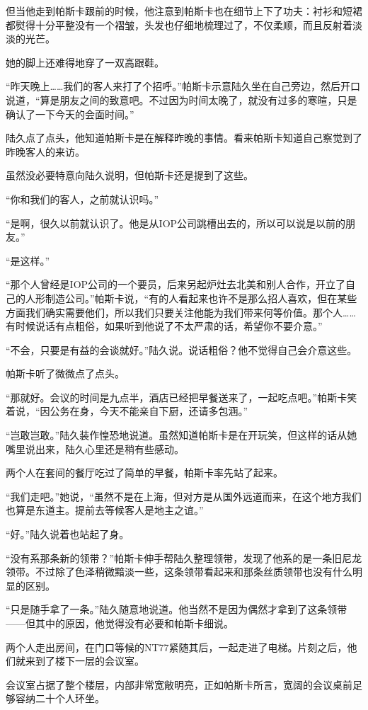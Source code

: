 但当他走到帕斯卡跟前的时候，他注意到帕斯卡也在细节上下了功夫：衬衫和短裙都熨得十分平整没有一个褶皱，头发也仔细地梳理过了，不仅柔顺，而且反射着淡淡的光芒。

她的脚上还难得地穿了一双高跟鞋。

“昨天晚上……我们的客人来打了个招呼。”帕斯卡示意陆久坐在自己旁边，然后开口说道，“算是朋友之间的致意吧。不过因为时间太晚了，就没有过多的寒暄，只是确认了一下今天的会面时间。”

陆久点了点头，他知道帕斯卡是在解释昨晚的事情。看来帕斯卡知道自己察觉到了昨晚客人的来访。

虽然没必要特意向陆久说明，但帕斯卡还是提到了这些。

“你和我们的客人，之前就认识吗。”

“是啊，很久以前就认识了。他是从IOP公司跳槽出去的，所以可以说是以前的朋友。”

“是这样。”

“那个人曾经是IOP公司的一个要员，后来另起炉灶去北美和别人合作，开立了自己的人形制造公司。”帕斯卡说，“有的人看起来也许不是那么招人喜欢，但在某些方面我们确实需要他们，所以我们只要关注他能为我们带来何等价值。那个人……有时候说话有点粗俗，如果听到他说了不太严肃的话，希望你不要介意。”

“不会，只要是有益的会谈就好。”陆久说。说话粗俗？他不觉得自己会介意这些。

帕斯卡听了微微点了点头。

“那就好。会议的时间是九点半，酒店已经把早餐送来了，一起吃点吧。”帕斯卡笑着说，“因公务在身，今天不能亲自下厨，还请多包涵。”

“岂敢岂敢。”陆久装作惶恐地说道。虽然知道帕斯卡是在开玩笑，但这样的话从她嘴里说出来，陆久心里还是稍有些感动。

两个人在套间的餐厅吃过了简单的早餐，帕斯卡率先站了起来。

“我们走吧。”她说，“虽然不是在上海，但对方是从国外远道而来，在这个地方我们也算是东道主。提前去等候客人是地主之谊。”

“好。”陆久说着也站起了身。

“没有系那条新的领带？”帕斯卡伸手帮陆久整理领带，发现了他系的是一条旧尼龙领带。不过除了色泽稍微黯淡一些，这条领带看起来和那条丝质领带也没有什么明显的区别。

“只是随手拿了一条。”陆久随意地说道。他当然不是因为偶然才拿到了这条领带——但其中的原因，他觉得没有必要和帕斯卡细说。

两个人走出房间，在门口等候的NT77紧随其后，一起走进了电梯。片刻之后，他们就来到了楼下一层的会议室。

会议室占据了整个楼层，内部非常宽敞明亮，正如帕斯卡所言，宽阔的会议桌前足够容纳二十个人环坐。

